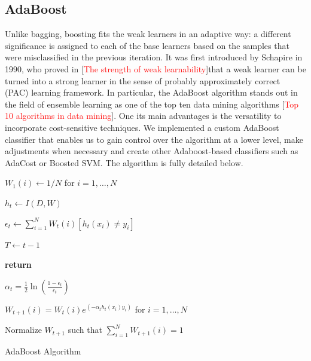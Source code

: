 \documentclass[conference]{IEEEtran}
\begin{document}
\subsection{AdaBoost}
Unlike bagging, boosting fits the weak learners in an adaptive way: a different significance is assigned to each of the base learners based on the samples that were misclassified in the previous iteration. It was first introduced by Schapire in 1990, who proved in [\textcolor{red}{The strength of weak learnability}]that a weak learner can be turned into a strong learner in the sense of probably approximately correct (PAC) learning framework. In particular, the AdaBoost algorithm stands out in the field of ensemble learning as one of the top ten data mining algorithms [\textcolor{red}{Top 10 algorithms in data mining}]. One its main advantages is the versatility to incorporate cost-sensitive techniques. We implemented a custom AdaBoost classifier that enables us to gain control over the algorithm at a lower level, make adjustments when necessary and create other Adaboost-based classifiers such as AdaCost or Boosted SVM. The algorithm is fully detailed below.

\begin{algorithm}
  $W_1(i) \leftarrow 1/N$ for $i=1,\dots,N$ %
  
    {
        $h_t \leftarrow I(D,W)$
        
        $\epsilon_t \leftarrow \sum^N_{i=1}W_t(i)[h_t(x_i)\neq y_i]$
        
        		{
		
		$T \leftarrow t-1$
		
		\bf{return}
		}
		
	$\alpha_t = \frac{1}{2}\ln \left( \frac{1-\epsilon_t}{\epsilon_t} \right)$
	
	  
	 $W_{t+1}(i) = W_t(i) e^{(-\alpha_th_t(x_i)y_i)}$ for $i=1,\dots,N$
	 
	 Normalize $W_{t+1}$ such that $\sum^N_{i=1}W_{t+1}(i)=1$
	  
    }
\caption{AdaBoost Algorithm}
\end{algorithm}
\end{document}
